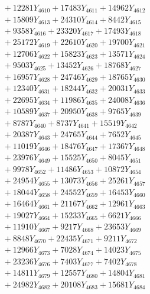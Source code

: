 \documentclass[a4paper,10pt]{article}
\begin{document}
{\begin{align}
&\;  + 12281 Y_{4610} + 17483 Y_{4611} + 14962 Y_{4612} \\[0.3ex]
&\;  + 15809 Y_{4613} + 24310 Y_{4614} + 8442 Y_{4615} \\[0.3ex]
&\;  + 9358 Y_{4616} + 23320 Y_{4617} + 17493 Y_{4618} \\[0.5ex]\allowbreak
&\;  + 25172 Y_{4619} + 22610 Y_{4620} + 19700 Y_{4621} \\[0.3ex]
&\;  + 12706 Y_{4622} + 15823 Y_{4623} + 13571 Y_{4624} \\[0.3ex]
&\;  + 9503 Y_{4625} + 13452 Y_{4626} + 18768 Y_{4627} \\[0.3ex]
&\;  + 16957 Y_{4628} + 24746 Y_{4629} + 18765 Y_{4630} \\[0.3ex]
&\;  + 12340 Y_{4631} + 18244 Y_{4632} + 20031 Y_{4633} \\[0.3ex]
&\;  + 22695 Y_{4634} + 11986 Y_{4635} + 24008 Y_{4636} \\[0.3ex]
&\;  + 10589 Y_{4637} + 20950 Y_{4638} + 9765 Y_{4639} \\[0.3ex]
&\;  + 8787 Y_{4640} + 8737 Y_{4641} + 15519 Y_{4642} \\[0.3ex]
&\;  + 20387 Y_{4643} + 24765 Y_{4644} + 7652 Y_{4645} \\[0.3ex]
&\;  + 11019 Y_{4646} + 18476 Y_{4647} + 17367 Y_{4648} \\[0.5ex]\allowbreak
&\;  + 23976 Y_{4649} + 15525 Y_{4650} + 8045 Y_{4651} \\[0.3ex]
&\;  + 9978 Y_{4652} + 11486 Y_{4653} + 10872 Y_{4654} \\[0.3ex]
&\;  + 24954 Y_{4655} + 13073 Y_{4656} + 25261 Y_{4657} \\[0.3ex]
&\;  + 18044 Y_{4658} + 24552 Y_{4659} + 16453 Y_{4660} \\[0.3ex]
&\;  + 16464 Y_{4661} + 21167 Y_{4662} + 12961 Y_{4663} \\[0.3ex]
&\;  + 19027 Y_{4664} + 15233 Y_{4665} + 6621 Y_{4666} \\[0.3ex]
&\;  + 11910 Y_{4667} + 9217 Y_{4668} + 23653 Y_{4669} \\[0.3ex]
&\;  + 8848 Y_{4670} + 22435 Y_{4671} + 9211 Y_{4672} \\[0.3ex]
&\;  + 12966 Y_{4673} + 7028 Y_{4674} + 14023 Y_{4675} \\[0.3ex]
&\;  + 23236 Y_{4676} + 7403 Y_{4677} + 7402 Y_{4678} \\[0.5ex]\allowbreak
&\;  + 14811 Y_{4679} + 12557 Y_{4680} + 14804 Y_{4681} \\[0.3ex]
&\;  + 24982 Y_{4682} + 20108 Y_{4683} + 15681 Y_{4684} \\[0.3ex]

\end{align}}
\end{document}

